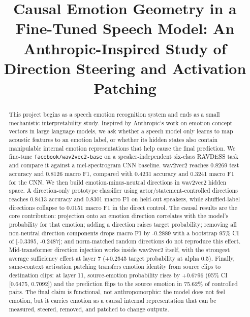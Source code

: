 \documentclass[conference]{IEEEtran}
\begin{document}
\title{Causal Emotion Geometry in a Fine-Tuned Speech Model: An Anthropic-Inspired Study of Direction Steering and Activation Patching}

\author{
}

\maketitle

\begin{abstract}
This project begins as a speech emotion recognition system and ends as a small mechanistic interpretability study. Inspired by Anthropic's work on emotion concept vectors in large language models, we ask whether a speech model only learns to map acoustic features to an emotion label, or whether its hidden states also contain manipulable internal emotion representations that help cause the final prediction. We fine-tune \texttt{facebook/wav2vec2-base} on a speaker-independent six-class RAVDESS task and compare it against a mel-spectrogram CNN baseline. wav2vec2 reaches 0.8269 test accuracy and 0.8126 macro F1, compared with 0.4231 accuracy and 0.3241 macro F1 for the CNN. We then build emotion-minus-neutral directions in wav2vec2 hidden space. A direction-only prototype classifier using actor/statement-controlled directions reaches 0.8413 accuracy and 0.8301 macro F1 on held-out speakers, while shuffled-label directions collapse to 0.0151 macro F1 in the direct control. The causal results are the core contribution: projection onto an emotion direction correlates with the model's probability for that emotion; adding a direction raises target probability; removing all non-neutral direction components drops macro F1 by -0.2889 with a bootstrap 95\% CI of [-0.3395, -0.2487]; and norm-matched random directions do not reproduce this effect. Mid-transformer direction injection works inside wav2vec2 itself, with the strongest average sufficiency effect at layer 7 (+0.2545 target probability at alpha 0.5). Finally, same-context activation patching transfers emotion identity from source clips to destination clips: at layer 11, source-emotion probability rises by +0.6796 (95\% CI [0.6475, 0.7092]) and the prediction flips to the source emotion in 75.62\% of controlled pairs. The final claim is functional, not anthropomorphic: the model does not feel emotion, but it carries emotion as a causal internal representation that can be measured, steered, removed, and patched to change outputs.
\end{abstract}
\end{document}
